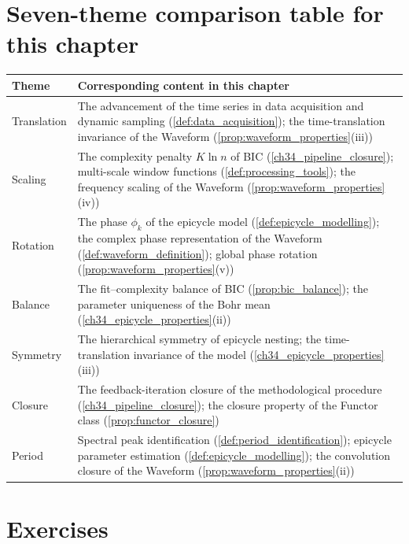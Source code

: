 \section*{Seven-theme comparison table for this chapter}

\begin{center}
\renewcommand{\arraystretch}{1.3}
\begin{tabularx}{\linewidth}{@{}>{\raggedright\arraybackslash\hspace{0pt}}p{2.8cm} >{\raggedright\arraybackslash\hspace{0pt}}X@{}}
\toprule
Theme & Corresponding content in this chapter \\
\midrule
Translation & The advancement of the time series in data acquisition and dynamic sampling (\cref{def:data_acquisition}); the time-translation invariance of the Waveform (\cref{prop:waveform_properties}(iii)) \\
Scaling & The complexity penalty $K\ln n$ of BIC (\cref{ch34_pipeline_closure}); multi-scale window functions (\cref{def:processing_tools}); the frequency scaling of the Waveform (\cref{prop:waveform_properties}(iv)) \\
Rotation & The phase $\phi_k$ of the epicycle model (\cref{def:epicycle_modelling}); the complex phase representation of the Waveform (\cref{def:waveform_definition}); global phase rotation (\cref{prop:waveform_properties}(v)) \\
Balance & The fit--complexity balance of BIC (\cref{prop:bic_balance}); the parameter uniqueness of the Bohr mean (\cref{ch34_epicycle_properties}(ii)) \\
Symmetry & The hierarchical symmetry of epicycle nesting; the time-translation invariance of the model (\cref{ch34_epicycle_properties}(iii)) \\
Closure & The feedback-iteration closure of the methodological procedure (\cref{ch34_pipeline_closure}); the closure property of the Functor class (\cref{prop:functor_closure}) \\
Period & Spectral peak identification (\cref{def:period_identification}); epicycle parameter estimation (\cref{def:epicycle_modelling}); the convolution closure of the Waveform (\cref{prop:waveform_properties}(ii)) \\
\bottomrule
\end{tabularx}
\end{center}

\section*{Exercises}

